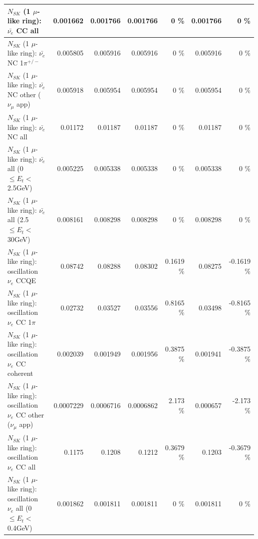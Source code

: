 \begin{table}
\begin{tabular}{| l | r | r | r  r | r  r |}
                            $N_{SK}$ (1 $\mu$-like ring): $\bar{\nu_{e}}$ CC all &        0.001662 &        0.001766 &        0.001766 &        0 \%  &        0.001766 &        0 \%  \\ 
\hline
                     $N_{SK}$ (1 $\mu$-like ring): $\bar{\nu_e}$ NC 1$\pi^{+/-}$ &        0.005805 &        0.005916 &        0.005916 &        0 \%  &        0.005916 &        0 \%  \\ 
            $N_{SK}$ (1 $\mu$-like ring): $\bar{\nu_e}$ NC other ($\nu_\mu$ app) &        0.005918 &        0.005954 &        0.005954 &        0 \%  &        0.005954 &        0 \%  \\ 
                            $N_{SK}$ (1 $\mu$-like ring): $\bar{\nu_{e}}$ NC all &         0.01172 &         0.01187 &         0.01187 &        0 \%  &         0.01187 &        0 \%  \\ 
\hline
     $N_{SK}$ (1 $\mu$-like ring): $\bar{\nu_{e}}$ all (0 $\leq E_{t} <$ 2.5GeV) &        0.005225 &        0.005338 &        0.005338 &        0 \%  &        0.005338 &        0 \%  \\ 
    $N_{SK}$ (1 $\mu$-like ring): $\bar{\nu_{e}}$ all (2.5 $\leq E_{t} <$ 30GeV) &        0.008161 &        0.008298 &        0.008298 &        0 \%  &        0.008298 &        0 \%  \\ 
\hline
\hline
\hline
                          $N_{SK}$ (1 $\mu$-like ring): oscillation $\nu_e$ CCQE &         0.08742 &         0.08288 &         0.08302 &   0.1619 \%  &         0.08275 &  -0.1619 \%  \\ 
                     $N_{SK}$ (1 $\mu$-like ring): oscillation $\nu_e$ CC 1$\pi$ &         0.02732 &         0.03527 &         0.03556 &   0.8165 \%  &         0.03498 &  -0.8165 \%  \\ 
                   $N_{SK}$ (1 $\mu$-like ring): oscillation $\nu_e$ CC coherent &        0.002039 &        0.001949 &        0.001956 &   0.3875 \%  &        0.001941 &  -0.3875 \%  \\ 
      $N_{SK}$ (1 $\mu$-like ring): oscillation $\nu_e$ CC other ($\nu_\mu$ app) &       0.0007229 &       0.0006716 &       0.0006862 &    2.173 \%  &        0.000657 &   -2.173 \%  \\ 
                       $N_{SK}$ (1 $\mu$-like ring): oscillation $\nu_e$  CC all &          0.1175 &          0.1208 &          0.1212 &   0.3679 \%  &          0.1203 &  -0.3679 \%  \\ 
\hline
$N_{SK}$ (1 $\mu$-like ring): oscillation $\nu_{e}$ all (0 $\leq E_{t} <$ 0.4GeV) &        0.001862 &        0.001811 &        0.001811 &        0 \%  &        0.001811 &        0 \%  \\ 

\end{tabular}
\end{table}
